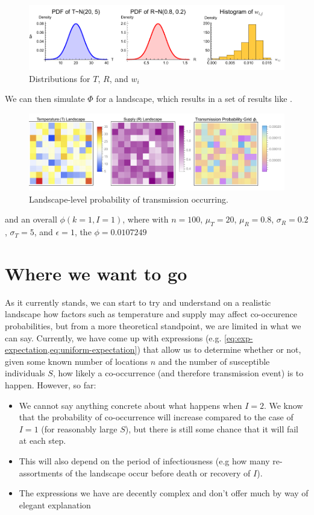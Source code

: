 \begin{figure}[!hpt]
    \centering
    \includegraphics[width=0.99\linewidth]{figs/si/R-T-pdfs-W-hist.pdf}
    \caption{Distributions for $T$, $R$, and $w_i$}
    \label{fig:t-s-wij-grid}
\end{figure}

We can then simulate $\Phi$ for a landscape, which results in a set of results like .

\begin{figure}[!hpt]
    \centering
    \includegraphics[width=0.8\linewidth]{figs/si/temp-supply-probability-landscape.pdf}
    \caption{Landscape-level probability of transmission occurring.}
    \label{fig:landscape-trans}
\end{figure}

and an overall $\phi(k=1, I=1)$, where with $n = 100$, $\mu_T = 20$, $\mu_R = 0.8$, $\sigma_R = 0.2$, $\sigma_T = 5$, and $\epsilon=1$, the $\phi = 0.0107249$

\section*{Where we want to go}

As it currently stands, we can start to try and understand on a realistic landscape how factors such as temperature and supply may affect co-occurence probabilities, but from a more theoretical standpoint, we are limited in what we can say. Currently, we have come up with expressions (e.g. \cref{eq:exp-expectation,eq:uniform-expectation}) that allow us to determine whether or not, given some known number of locations $n$ and the number of susceptible individuals $S$, how likely a co-occurrence (and therefore transmission event) is to happen. However, so far: 
\begin{itemize}
    \item We cannot say anything concrete about what happens when $I=2$.   We know that the probability of co-occurrence will increase compared to the case of $I=1$ (for reasonably large $S$), but there is still some chance that it will fail at each step.  
    \item This will also depend on the period of infectiousness (e.g how many re-assortments of the landscape occur before death or recovery of $I$).
    \item The expressions we have are decently complex and don't offer much by way of elegant explanation 
\end{itemize}

